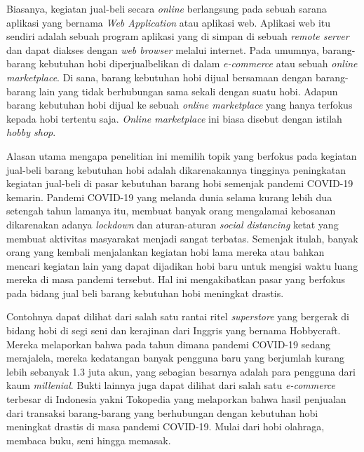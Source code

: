 \documentclass[a4paper]{article}
\begin{document}
Biasanya, kegiatan jual-beli secara \textit{online} berlangsung pada sebuah sarana aplikasi yang bernama \textit{Web Application} atau aplikasi web. Aplikasi web itu sendiri adalah sebuah program aplikasi yang di simpan di sebuah \textit{remote server} dan dapat diakses dengan \textit{web browser} melalui internet\autocite{what-is-web-app}. Pada umumnya, barang-barang kebutuhan hobi diperjualbelikan di dalam \textit{e-commerce} atau sebuah \textit{online marketplace}. Di sana, barang kebutuhan hobi dijual bersamaan dengan barang-barang lain yang tidak berhubungan sama sekali dengan suatu hobi. Adapun barang kebutuhan hobi dijual ke sebuah \textit{online marketplace} yang hanya terfokus kepada hobi tertentu saja. \textit{Online marketplace} ini biasa disebut dengan istilah \textit{hobby shop}.

Alasan utama mengapa penelitian ini memilih topik yang berfokus pada kegiatan jual-beli barang kebutuhan hobi adalah dikarenakannya tingginya peningkatan kegiatan jual-beli di pasar kebutuhan barang hobi semenjak pandemi COVID-19 kemarin. Pandemi COVID-19 yang melanda dunia selama kurang lebih dua setengah tahun lamanya itu, membuat banyak orang mengalamai kebosanan dikarenakan adanya \textit{lockdown} dan aturan-aturan \textit{social distancing} ketat yang membuat aktivitas masyarakat menjadi sangat terbatas\autocite{boredom-in-covid-19-pandemic}. Semenjak itulah, banyak orang yang kembali menjalankan kegiatan hobi lama mereka atau bahkan mencari kegiatan lain yang dapat dijadikan hobi baru untuk mengisi waktu luang mereka di masa pandemi tersebut. Hal ini mengakibatkan pasar yang berfokus pada bidang jual beli barang kebutuhan hobi meningkat drastis.

Contohnya dapat dilihat dari salah satu rantai ritel \textit{superstore} yang bergerak di bidang hobi di segi seni dan kerajinan dari Inggris yang bernama Hobbycraft. Mereka melaporkan bahwa pada tahun dimana pandemi COVID-19 sedang merajalela, mereka kedatangan banyak pengguna baru yang berjumlah kurang lebih sebanyak 1.3 juta akun, yang sebagian besarnya adalah para pengguna dari kaum \textit{millenial}\autocite{hobbycraft-fast-online-growth}. Bukti lainnya juga dapat dilihat dari salah satu \textit{e-commerce} terbesar di Indonesia yakni Tokopedia yang melaporkan bahwa hasil penjualan dari transaksi barang-barang yang berhubungan dengan kebutuhan hobi meningkat drastis di masa pandemi COVID-19. Mulai dari hobi olahraga, membaca buku, seni hingga memasak\autocite{tokped-hobbies-goods-sales-increased}.
\end{document}
